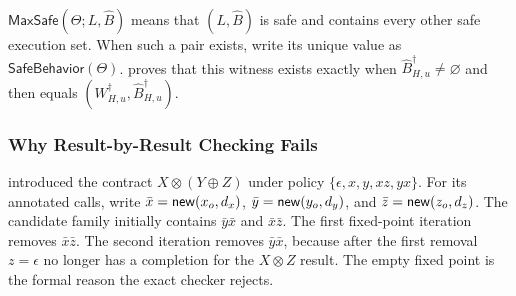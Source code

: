 \(\mathsf{MaxSafe}(\Theta;L,\widehat B)\) means that \((L,\widehat B)\) is safe and contains every other safe execution set.
When such a pair exists, write its unique value as \(\mathsf{SafeBehavior}(\Theta)\).
 proves that this witness exists exactly when \(\widehat B^\dagger_{H,u}\ne\varnothing\) and then equals \((W^\dagger_{H,u},\widehat B^\dagger_{H,u})\).

\subsubsection{Why Result-by-Result Checking Fails}

 introduced the contract \(X\otimes(Y\oplus Z)\) under policy \(\{\epsilon,x,y,xz,yx\}\).
For its annotated calls, write \(\bar x=\mathsf{new}(x_o,d_x)\), \(\bar y=\mathsf{new}(y_o,d_y)\), and \(\bar z=\mathsf{new}(z_o,d_z)\).
The candidate family initially contains \(\bar y\bar x\) and \(\bar x\bar z\).
The first fixed-point iteration removes \(\bar x\bar z\).
The second iteration removes \(\bar y\bar x\), because after the first removal \(z=\epsilon\) no longer has a completion for the \(X\otimes Z\) result.
The empty fixed point is the formal reason the exact checker rejects.

